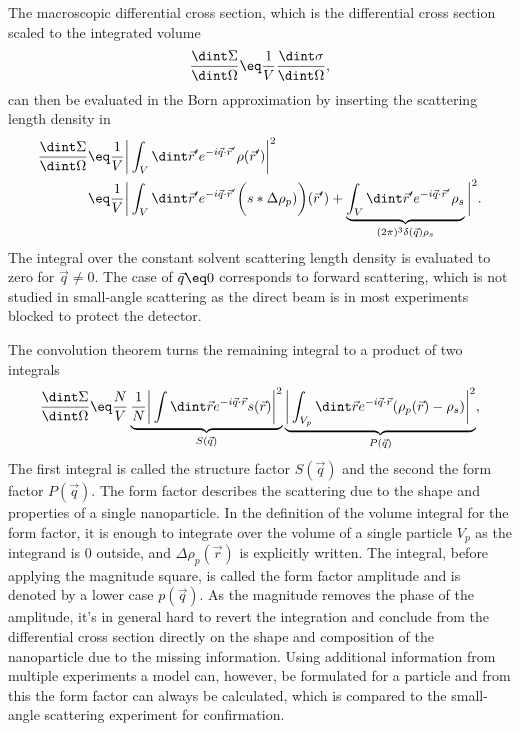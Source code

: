 \documentclass[\main/dresen_thesis.tex]{subfiles}
\begin{document}
The macroscopic differential cross section, which is the differential cross section scaled to the integrated volume
\begin{align}
  \frac{\dint \Sigma}{\dint \Omega} \eq \frac{1}{V} \frac{\dint \sigma}{\dint \Omega},
\end{align}
can then be evaluated in the Born approximation by inserting the scattering length density in 
\begin{align}
  \frac{\dint \Sigma}{\dint \Omega}
  \eq& \frac{1}{V} \bigg| \int_V \dint \vec{r}^\prime e^{-i\vec{q} \cdot \vec{r}^\prime} \rho (\vec{r}^\prime) \bigg|^2 \\
  \eq& \frac{1}{V} \bigg| \int_{V} \dint \vec{r}^\prime e^{-i\vec{q} \cdot \vec{r}^\prime} \biggl( s * \Delta \rho_{p}) \biggr) (\vec{r}^\prime) + \underbrace{\int_{V} \dint \vec{r}^\prime e^{-i\vec{q} \cdot \vec{r}^\prime} \rho_s }_{(2 \pi)^3 \delta(\vec{q}) \rho_s} \bigg|^2.
\end{align}
The integral over the constant solvent scattering length density is evaluated to zero for $\vec{q} \neq 0$.
The case of $\vec{q} \eq 0$ corresponds to forward scattering, which is not studied in small-angle scattering as the direct beam is in most experiments blocked to protect the detector.

The convolution theorem turns the remaining integral to a product of two integrals
\begin{align}
  \frac{\dint \Sigma}{\dint \Omega}
  \eq \frac{N}{V} \underbrace{\frac{1}{N} \bigg|\int \dint \vec{r} e^{-i\vec{q} \cdot \vec{r}} s(\vec{r})\bigg|^2}_{S(\vec{q})}
  \underbrace{ \bigg|\int_{V_{p}} \dint \vec{r} e^{-i\vec{q} \cdot \vec{r}} (\rho_p (\vec{r}) - \rho_s) \bigg|^2}_{P(\vec{q})},\label{eq:theoreticalBackground:scattering:scatteringTheory:sasParticlesformStructureFactor}
\end{align}
The first integral is called the structure factor $S(\vec{q})$ and the second the form factor $P(\vec{q})$.
The form factor describes the scattering due to the shape and properties of a single nanoparticle.
In the definition of the volume integral for the form factor, it is enough to integrate over the volume of a single particle $V_p$ as the integrand is $0$ outside, and $\Delta \rho_p (\vec{r})$ is explicitly written.
The integral, before applying the magnitude square, is called the form factor amplitude and is denoted by a lower case $p(\vec{q})$.
As the magnitude removes the phase of the amplitude, it's in general hard to revert the integration and conclude from the differential cross section directly on the shape and composition of the nanoparticle due to the missing information.
Using additional information from multiple experiments a model can, however, be formulated for a particle and from this the form factor can always be calculated, which is compared to the small-angle scattering experiment for confirmation.
\end{document}
